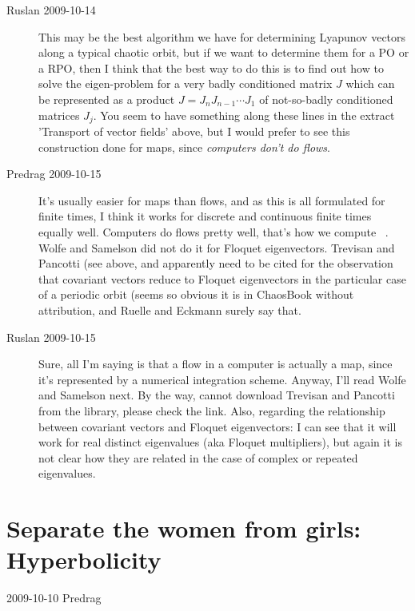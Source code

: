 \begin{description}
  \item[Ruslan 2009-10-14]
 This may be the best
algorithm we have for determining Lyapunov vectors along a
typical chaotic orbit, but if we want to determine them for a
PO or a RPO, then I think that the best way to do this is to
find out how to solve the eigen-problem for a very badly
conditioned matrix $J$ which can be represented as a product
$J = J_{n}J_{n-1}\cdots J_1$ of not-so-badly conditioned
matrices $J_j$.  You seem to have something along these lines
in the extract 'Transport of vector fields' above, but I
would prefer to see this construction done for maps, since
\emph{computers don't do flows}.


\item[Predrag 2009-10-15]
It's usually easier for maps than flows, and as this is all
formulated for finite times, I think it works for discrete
and continuous finite times equally well. Computers do flows
pretty well, that's how we compute \FloquetM\ \monodromy.
Wolfe and Samelson did not do it for Floquet
eigenvectors. Trevisan and Pancotti (see above, and
 apparently need to be cited for the
observation that covariant vectors reduce to Floquet
eigenvectors in the particular case of a periodic orbit
(seems so obvious it is in ChaosBook without attribution, and
Ruelle and Eckmann surely say that.

\item[Ruslan 2009-10-15]
Sure, all I'm saying is that a flow in a computer is actually
a map, since it's represented by a numerical integration
scheme.  Anyway, I'll read Wolfe and Samelson
next.  By the way, cannot download Trevisan and Pancotti from
the library, please check the link.  Also, regarding the
relationship between  covariant vectors and Floquet
eigenvectors: I can see that it will work for real distinct
eigenvalues (aka Floquet multipliers), but again it is not
clear how they are related in the case of complex or repeated
eigenvalues.

\end{description}


\section{Separate the women from girls: Hyperbolicity}
\begin{description}
\item[2009-10-10 Predrag]
\end{description}

